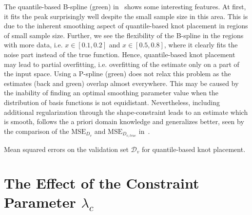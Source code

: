 The quantile-based B-spline (green) in~ shows some interesting features. At first, it fits the peak surprisingly well despite the small sample size in this area. This is due to the inherent smoothing aspect of quantile-based knot placement in regions of small sample size. Further, we see the flexibility of the B-spline in the regions with more data, i.e. $x\in[0.1,0.2]$ and $x \in [0.5,0.8]$, where it clearly fits the noise part instead of the true function. Hence, quantile-based knot placement may lead to partial overfitting, i.e. overfitting of the estimate only on a part of the input space. Using a P-spline (green) does not relax this problem as the estimates (back and green) overlap almost everywhere. This may be caused by the inability of finding an optimal smoothing parameter value when the distribution of basis functions is not equidistant. Nevertheless, including additional regularization through the shape-constraint leads to an estimate which is smooth, follows the a priori domain knowledge and generalizes better, seen by the comparison of the $\text{MSE}_{D_v}$ and $\text{MSE}_{D_{v, true}}$ in~.


\begin{table}[H]
	\begin{center}
	\end{center}
	\caption{Mean squared errors on the validation set $\mathcal{D}_v$ for quantile-based knot placement.}
	\label{tab:sparse-example-quantile}
\end{table}



\section{The Effect of the Constraint Parameter $\lambda_c$} \label{sec:lambda_c_sec}

